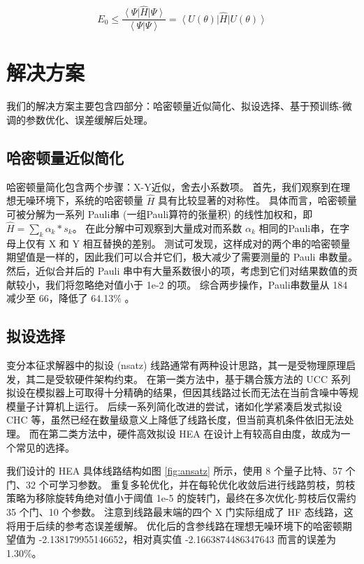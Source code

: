 \documentclass[withoutpreface,bwprint]{cumcmthesis}
\begin{document}
\begin{equation}
E_0 \le \frac{\left< \Psi  \right| \hat H \left| \Psi \right>}{\left< \Psi | \Psi \right>} = \left< U(\theta)  \right| \hat H \left| U(\theta) \right>
\label{eq:rr-method}
\end{equation}


\section{解决方案}

我们的解决方案主要包含四部分：哈密顿量近似简化、拟设选择、基于预训练-微调的参数优化、误差缓解后处理。

\subsection{哈密顿量近似简化}

哈密顿量简化包含两个步骤：X-Y近似，舍去小系数项。
首先，我们观察到在理想无噪环境下，系统的哈密顿量 $ \hat H $ 具有比较显著的对称性。
具体而言，哈密顿量可被分解为一系列 Pauli串 (一组Pauli算符的张量积) 的线性加权和，即 $ \hat H = \sum_k \alpha_k * s_k $。
在此分解中可观察到大量成对而系数 $ \alpha_k $ 相同的Pauli串，在字母上仅有 X 和 Y 相互替换的差别。
测试可发现，这样成对的两个串的哈密顿量期望值是一样的，因此我们可以合并它们，极大减少了需要测量的 Pauli 串数量。
然后，近似合并后的 Pauli 串中有大量系数很小的项，考虑到它们对结果数值的贡献较小，我们将忽略绝对值小于 1e-2 的项。
综合两步操作，Pauli串数量从 184 减少至 66，降低了 64.13\% 。

\subsection{拟设选择}

变分本征求解器中的拟设 (nsatz) 线路通常有两种设计思路，其一是受物理原理启发，其二是受软硬件架构约束。
在第一类方法中，基于耦合簇方法的 UCC \cite{UCC2017} 系列拟设在模拟器上可取得十分精确的结果，但因其线路过长而无法在当前含噪中等规模量子计算机上运行。
后续一系列简化改进的尝试，诸如化学紧凑启发式拟设 CHC \cite{CHC2020} 等，虽然已经在数量级意义上降低了线路长度，但当前真机条件依旧无法处理。
而在第二类方法中，硬件高效拟设 HEA \cite{HEA2017} 在设计上有较高自由度，故成为一个常见的选择。

我们设计的 HEA 具体线路结构如图 \ref{fig:ansatz} 所示，使用 8 个量子比特、57 个门、32 个可学习参数。
重复多轮优化，并在每轮优化收敛后进行线路剪枝，剪枝策略为移除旋转角绝对值小于阈值 1e-5 的旋转门，最终在多次优化-剪枝后仅需约 35 个门、10 个参数。
注意到线路最末端的四个 X 门实际组成了 HF 态线路，这将用于后续的参考态误差缓解。
优化后的含参线路在理想无噪环境下的哈密顿期望值为 -2.138179955146652，相对真实值 -2.1663874486347643 而言的误差为 1.30\%。
\end{document}
